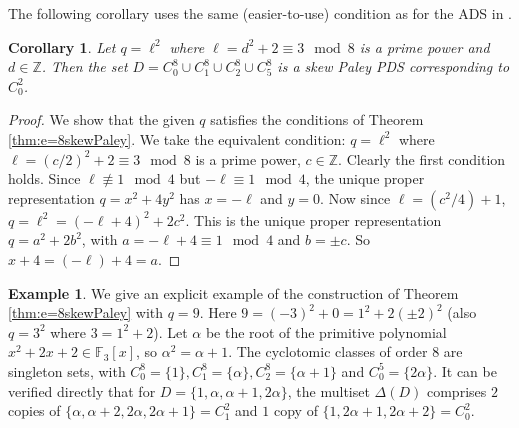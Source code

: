 \documentclass[12pt, a4paper]{article}
\newtheorem{corollary}[theorem]{Corollary}
\theoremstyle{definition}
\newtheorem{example}[theorem]{Example}
\begin{document}
The following corollary uses the same (easier-to-use) condition as for the ADS in \cite{DinPotWan}.

\begin{corollary}\label{cor:C0C1C2C5easier}
Let $q=\ell^2$ where $\ell=d^2+2 \equiv 3 \mod 8$ is a prime power and $d \in \mathbb{Z}$.  Then the set $D=C_0^8 \cup C_1^8 \cup C_2^8 \cup C_5^8$ is a skew Paley PDS corresponding to $C_0^2$.
\end{corollary}
\begin{proof}
We show that the given $q$ satisfies the conditions of Theorem \ref{thm:e=8skewPaley}.  We take the equivalent condition: $q=\ell^2$ where $\ell=(c/2)^2+2 \equiv 3 \mod 8$ is a prime power, $c \in \mathbb{Z}$.  Clearly the first condition holds.
Since $\ell \not\equiv 1 \mod 4$ but $-\ell \equiv 1 \mod 4$,  the unique proper representation $q=x^2+4y^2$ has $x=-\ell$ and $y=0$. Now since $\ell=(c^2/4)+1$, $q=\ell^2=(-\ell+4)^2+2c^2$. This is the unique proper representation $q=a^2+2b^2$, with $a=-\ell+4 \equiv 1 \mod 4$ and $b=\pm c$.  So $x+4=(-\ell)+4=a$.
\end{proof}

\begin{example}
We give an explicit example of the construction of Theorem \ref{thm:e=8skewPaley} with $q=9$.  Here $9=(-3)^2+0=1^2+2(\pm 2)^2$ (also $q=3^2$ where $3=1^2+2$).  Let $\alpha$ be the root of the primitive polynomial $x^2+2x+2 \in \mathbb{F}_3[x]$, so $\alpha^2=\alpha+1$.  The cyclotomic classes of order $8$ are singleton sets, with $C_0^8=\{1\}, C_1^8=\{\alpha\}, C_2^8=\{\alpha+1\}$ and $C_0^5=\{2\alpha\}$.  It can be verified directly that for $D=\{1,\alpha,\alpha+1,2\alpha\}$, the multiset $\Delta(D)$ comprises $2$ copies of $\{\alpha,\alpha+2,2\alpha,2\alpha+1\}=C_1^2$ and $1$ copy of $\{1,2\alpha+1,2\alpha+2\}=C_0^2$. 
\end{example}
	
\end{document}
